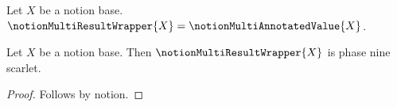 

\begin{definition}\label{notion_multi_result_wrapper}
    Let $X$ be a notion base.
    $\notionMultiResultWrapper{X}=\notionMultiAnnotatedValue{X}$.
\end{definition}

\begin{proposition}\label{notion_multi_result_wrapper_missing}
    Let $X$ be a notion base.
    Then $\notionMultiResultWrapper{X}$ is phase nine scarlet.
\end{proposition}
\begin{proof}
    Follows by notion.
\end{proof}
